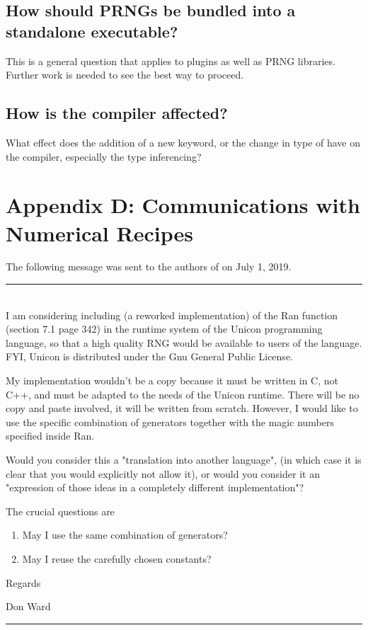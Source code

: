 \documentclass[letterpaper,12pt]{article}
\begin{document}
\subsection*{How should PRNGs be bundled into a standalone executable?}
This is a general question that applies to plugins as well as PRNG
libraries. Further work is needed to see the best way to proceed.

\subsection*{How is the compiler affected?}
What effect does the addition of a new keyword, or the change in type of
\rndkwd have on the compiler, especially the type inferencing?

\section*{Appendix D: Communications with Numerical Recipes}
  The following message was sent to the authors of
  \cite{PressEtAl:numericalRecipes} on July 1, 2019. 

{\sf\small
\noindent\rule{80mm}{0.25mm}\\
I am considering including (a reworked implementation) of the Ran function
(section 7.1 page 342) in the runtime system of the Unicon programming
language, so that a high quality RNG would be available to users of the
language.  FYI, Unicon is distributed under the Gnu General Public License.
  
My implementation wouldn't be a copy because it must be written in C, not
C++, and must be adapted to the needs of the Unicon runtime. There will be
no copy and paste involved, it will be written from scratch. However, I
would like to use the specific combination of generators together with the
magic numbers specified inside Ran.

Would you consider this a "translation into another language", (in which
case it is clear that you would explicitly not allow it), or would you
consider it an "expression of those ideas in a completely different
implementation"?

The crucial questions are
\begin{enumerate}
\item May I use the same combination of generators?
\item May I reuse the carefully chosen constants?
\end{enumerate}
Regards

Don Ward

\noindent\rule{80mm}{0.25mm}\\
}
\vspace{0.5cm}
\end{document}
